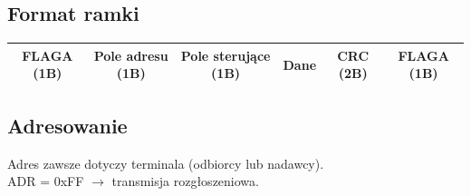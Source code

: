		\subsection{Format ramki}
			\begin{table}[h]
				\begin{tabular}{|c|c|c|c|c|c|}
					\hline
					FLAGA (1B)	&	Pole adresu (1B)	&	Pole sterujące (1B)	&	Dane	&	CRC (2B)	& FLAGA (1B)	\\ \hline
				\end{tabular}
			\end{table}
		\subsection{Adresowanie}
			Adres zawsze dotyczy terminala (odbiorcy lub nadawcy).\\
			ADR = 0xFF $ \longrightarrow $ transmisja rozgłoszeniowa.
